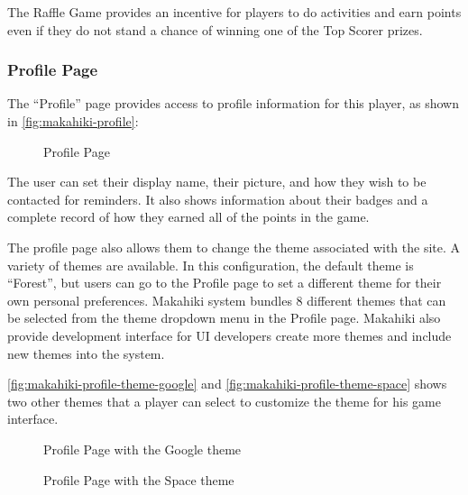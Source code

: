 The Raffle Game provides an incentive for players to do activities and earn points even if they do not stand a chance of winning one of the Top Scorer prizes.

\clearpage

\subsubsection{Profile Page}

The ``Profile'' page provides access to profile information for this player, as shown in \autoref{fig:makahiki-profile}:

\begin{figure}[!ht]
\begin{center}
\end{center}
\caption{Profile Page}
\label{fig:makahiki-profile}
\end{figure}

The user can set their display name, their picture, and how they wish to be contacted for reminders. It also shows information about their badges and a complete record of how they earned all of the points in the game.

The profile page also allows them to change the theme associated with the site. A variety of themes are available. In this configuration, the default theme is ``Forest'', but users can go to the Profile page to set a different theme for their own personal preferences. Makahiki system bundles 8 different themes that can be selected from the theme dropdown menu in the Profile page. Makahiki also provide development interface for UI developers create more themes and include new themes into the system. 

\clearpage

\autoref{fig:makahiki-profile-theme-google} and \autoref{fig:makahiki-profile-theme-space} shows two other themes that a player can select to customize the theme for his game interface.

\begin{figure}[!ht]
\begin{center}
\end{center}
\caption{Profile Page with the Google theme}
\label{fig:makahiki-profile-theme-google}
\end{figure}

\begin{figure}[!ht]
\begin{center}
\end{center}
\caption{Profile Page with the Space theme}
\label{fig:makahiki-profile-theme-space}
\end{figure}

